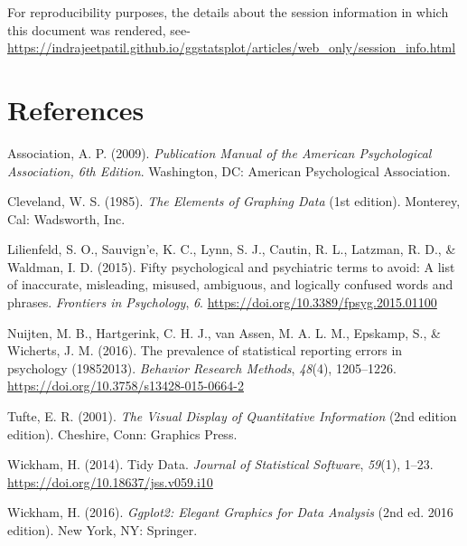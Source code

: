 \documentclass[
]{article}
\newlength{\cslhangindent}
\newenvironment{cslreferences}%
  {\setlength{\parindent}{0pt}%
  \everypar{\setlength{\hangindent}{\cslhangindent}}\ignorespaces}%
  {\par}
\begin{document}
For reproducibility purposes, the details about the session information in which
this document was rendered, see-
\url{https://indrajeetpatil.github.io/ggstatsplot/articles/web_only/session_info.html}

\newpage

\hypertarget{references}{%
\section*{References}\label{references}}

\hypertarget{refs}{}
\begin{cslreferences}
\leavevmode\hypertarget{ref-associationPublicationManualAmerican2009}{}%
Association, A. P. (2009). \emph{Publication Manual of the American Psychological Association, 6th Edition}. Washington, DC: American Psychological Association.

\leavevmode\hypertarget{ref-clevelandElementsGraphingData1985}{}%
Cleveland, W. S. (1985). \emph{The Elements of Graphing Data} (1st edition). Monterey, Cal: Wadsworth, Inc.

\leavevmode\hypertarget{ref-lilienfeldFiftyPsychologicalPsychiatric2015}{}%
Lilienfeld, S. O., Sauvign\a'e, K. C., Lynn, S. J., Cautin, R. L., Latzman, R. D., \& Waldman, I. D. (2015). Fifty psychological and psychiatric terms to avoid: A list of inaccurate, misleading, misused, ambiguous, and logically confused words and phrases. \emph{Frontiers in Psychology}, \emph{6}. \url{https://doi.org/10.3389/fpsyg.2015.01100}

\leavevmode\hypertarget{ref-nuijtenPrevalenceStatisticalReporting2016}{}%
Nuijten, M. B., Hartgerink, C. H. J., van Assen, M. A. L. M., Epskamp, S., \& Wicherts, J. M. (2016). The prevalence of statistical reporting errors in psychology (19852013). \emph{Behavior Research Methods}, \emph{48}(4), 1205--1226. \url{https://doi.org/10.3758/s13428-015-0664-2}

\leavevmode\hypertarget{ref-tufteVisualDisplayQuantitative2001}{}%
Tufte, E. R. (2001). \emph{The Visual Display of Quantitative Information} (2nd edition edition). Cheshire, Conn: Graphics Press.

\leavevmode\hypertarget{ref-wickhamTidyData2014}{}%
Wickham, H. (2014). Tidy Data. \emph{Journal of Statistical Software}, \emph{59}(1), 1--23. \url{https://doi.org/10.18637/jss.v059.i10}

\leavevmode\hypertarget{ref-wickhamGgplot2ElegantGraphics2016}{}%
Wickham, H. (2016). \emph{Ggplot2: Elegant Graphics for Data Analysis} (2nd ed. 2016 edition). New York, NY: Springer.
\end{cslreferences}
\end{document}
